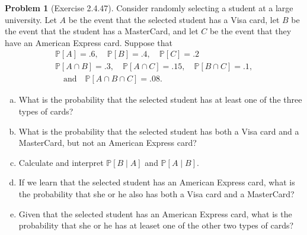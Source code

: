 \documentclass[10pt]{article}
\theoremstyle{definition}
\newtheorem{problem}[theorem]{Problem}
\newcommand{\1}[1]{\textbf{1}_{\left[#1\right]}} %
\def\P{\mathbb{P}} %
\begin{document}
\begin{problem}[Exercise 2.4.47]
  Consider randomly selecting a student at a large university. Let $A$ be the
  event that the selected student has a Visa card, let $B$ be the event that
  the student has a MasterCard, and let $C$ be the event that they have an
  American Express card. Suppose that
  \begin{gather}
    \P\left[A \right] = .6, \quad \P\left[B \right] = .4, \quad \P\left[C \right] = .2\\
    \P\left[A\cap B \right] = .3, \quad \P\left[A\cap C \right] = .15, \quad \P\left[B\cap C \right] = .1, \\
    \quad \text{and} \quad \P\left[A\cap B\cap C \right]=.08.
  \end{gather}
  \begin{enumerate}[(a)]
    \item What is the probability that the selected student has at least one
    of the three types of cards?
    \item What is the probability that the selected student has both a Visa
    card and a MasterCard, but not an American Express card?
    \item Calculate and interpret $\P\left[B\mid A \right]$ and $\P\left[A\mid
      B\right]$.
    \item If we learn that the selected student has an American Express card,
    what is the probability that she or he also has both a Visa card and a
    MasterCard?
    \item Given that the selected student has an American Express card, what
    is the probability that she or he has at leaset one of the other two types
    of cards?
  \end{enumerate}
\end{problem}
\end{document}
